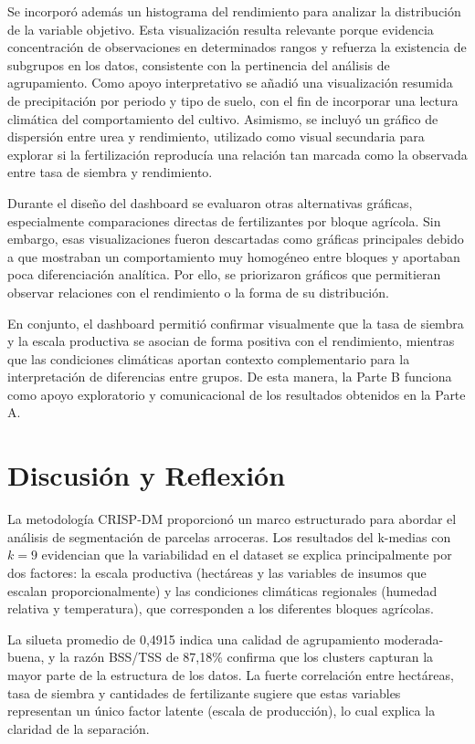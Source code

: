 \documentclass[10pt,a4paper]{article}
\begin{document}
Se incorporó además un histograma del rendimiento para analizar la distribución de la variable objetivo. Esta visualización resulta relevante porque evidencia concentración de observaciones en determinados rangos y refuerza la existencia de subgrupos en los datos, consistente con la pertinencia del análisis de agrupamiento. Como apoyo interpretativo se añadió una visualización resumida de precipitación por periodo y tipo de suelo, con el fin de incorporar una lectura climática del comportamiento del cultivo. Asimismo, se incluyó un gráfico de dispersión entre urea y rendimiento, utilizado como visual secundaria para explorar si la fertilización reproducía una relación tan marcada como la observada entre tasa de siembra y rendimiento.

Durante el diseño del dashboard se evaluaron otras alternativas gráficas, especialmente comparaciones directas de fertilizantes por bloque agrícola. Sin embargo, esas visualizaciones fueron descartadas como gráficas principales debido a que mostraban un comportamiento muy homogéneo entre bloques y aportaban poca diferenciación analítica. Por ello, se priorizaron gráficos que permitieran observar relaciones con el rendimiento o la forma de su distribución.

En conjunto, el dashboard permitió confirmar visualmente que la tasa de siembra y la escala productiva se asocian de forma positiva con el rendimiento, mientras que las condiciones climáticas aportan contexto complementario para la interpretación de diferencias entre grupos. De esta manera, la Parte B funciona como apoyo exploratorio y comunicacional de los resultados obtenidos en la Parte A.

\section{Discusión y Reflexión}

La metodología CRISP-DM proporcionó un marco estructurado para abordar el análisis de segmentación de parcelas arroceras. Los resultados del k-medias con $k = 9$ evidencian que la variabilidad en el dataset se explica principalmente por dos factores: la escala productiva (hectáreas y las variables de insumos que escalan proporcionalmente) y las condiciones climáticas regionales (humedad relativa y temperatura), que corresponden a los diferentes bloques agrícolas.

La silueta promedio de 0,4915 indica una calidad de agrupamiento moderada-buena, y la razón BSS/TSS de 87,18\% confirma que los clusters capturan la mayor parte de la estructura de los datos. La fuerte correlación entre hectáreas, tasa de siembra y cantidades de fertilizante sugiere que estas variables representan un único factor latente (escala de producción), lo cual explica la claridad de la separación.
\end{document}

